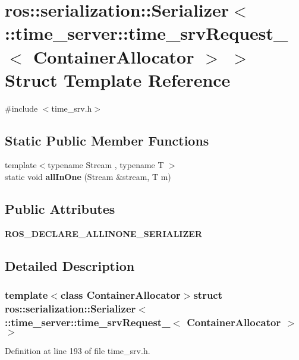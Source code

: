 \section{ros\-:\-:serialization\-:\-:\-Serializer$<$ \-:\-:time\-\_\-server\-:\-:time\-\_\-srv\-Request\-\_\-$<$ \-Container\-Allocator $>$ $>$ \-Struct \-Template \-Reference}
\label{structros_1_1serialization_1_1Serializer_3_01_1_1time__server_1_1time__srvRequest___3_01ContainerAllocator_01_4_01_4}


{\ttfamily \#include $<$time\-\_\-srv.\-h$>$}

\subsection*{\-Static \-Public \-Member \-Functions}
\begin{DoxyCompactItemize}
\item 
{\footnotesize template$<$typename Stream , typename T $>$ }\\static void {\bf all\-In\-One} (\-Stream \&stream, \-T m)
\end{DoxyCompactItemize}
\subsection*{\-Public \-Attributes}
\begin{DoxyCompactItemize}
\item 
{\bf \-R\-O\-S\-\_\-\-D\-E\-C\-L\-A\-R\-E\-\_\-\-A\-L\-L\-I\-N\-O\-N\-E\-\_\-\-S\-E\-R\-I\-A\-L\-I\-Z\-E\-R}
\end{DoxyCompactItemize}


\subsection{\-Detailed \-Description}
\subsubsection*{template$<$class Container\-Allocator$>$struct ros\-::serialization\-::\-Serializer$<$ \-::time\-\_\-server\-::time\-\_\-srv\-Request\-\_\-$<$ Container\-Allocator $>$ $>$}



\-Definition at line 193 of file time\-\_\-srv.\-h.



